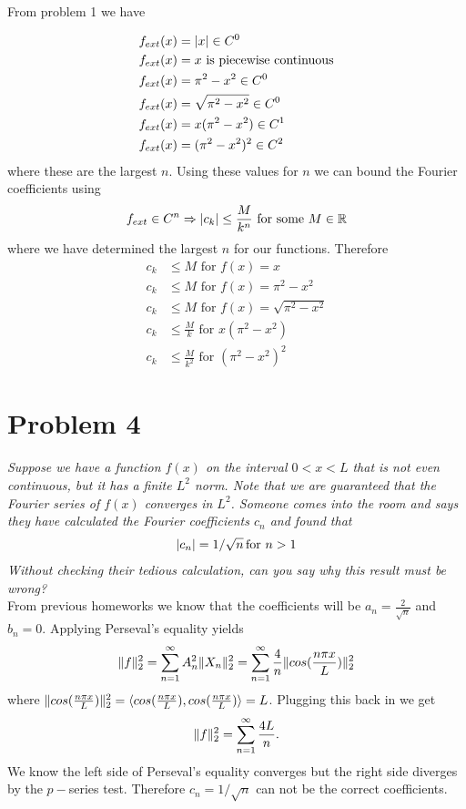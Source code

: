 \documentclass[12pt]{article}
\DeclarePairedDelimiter \abs{\lvert}{\rvert}%
\DeclarePairedDelimiter \norm{\lVert}{\rVert}%
\theoremstyle{remark}
\begin{document}
From problem 1 we have 

\begin{align*}
	f_{ext}(x) & = \abs{x} \in C^0 \\
	f_{ext}(x) & = x \text{ is piecewise continuous} \\
	f_{ext}(x) & = \pi^2 - x^2 \in C^0 \\
	f_{ext}(x) & = \sqrt{\pi^2 - x^2} \in C^0 \\
	f_{ext}(x) & = x(\pi^2 - x^2) \in C^1 \\
	f_{ext}(x) & = (\pi^2 - x^2)^2 \in C^2
\end{align*}
where these are the largest $n$. Using these values for $n$ we can bound the Fourier coefficients using 
\begin{align*}
	f_{ext} \in C^n \Rightarrow \abs{c_k} \leq \frac{M}{k^n} \text{ for some } M \in \mathbb{R}
\end{align*}
where we have determined the largest $n$ for our functions. Therefore 
\begin{align*}
	c_k & \leq M \text{ for } f(x) = x \\
	c_k & \leq M \text{ for } f(x) = \pi^2 - x^2 \\
	c_k & \leq M \text{ for } f(x) = \sqrt{\pi^2 - x^2} \\
	c_k & \leq \frac{M}{k} \text{ for } x(\pi^2 - x^2) \\
	c_k & \leq \frac{M}{k^2} \text{ for } (\pi^2 - x^2)^2
\end{align*}

\newpage

\section*{Problem 4}

\textit{Suppose we have a function $f(x)$ on the interval $0 < x < L$ that is not even continuous, but it has a finite $L^2$ norm. Note that we are guaranteed that the Fourier series of $f(x)$ converges in $L^2$. Someone comes into the room and says they have calculated the Fourier coefficients $c_n$ and found that}
\begin{align}
	\abs{c_n} = 1/\sqrt{n} \, \text{for $n > 1$}
\end{align}
\textit{Without checking their tedious calculation, can you say why this result must be wrong?} \\

From previous homeworks we know that the coefficients will be $a_n = \frac{2}{\sqrt{n}}$ and $b_n = 0$. Applying Perseval's equality yields
\begin{align*}
	\norm{f}_2^2 = \sum\limits_{n=1}^\infty A_n^2 \norm{X_n}_2^2 = \sum\limits_{n=1}^\infty \frac{4}{n}\norm{cos(\frac{n\pi x}{L})}_2^2
\end{align*}
where $\norm{cos(\frac{n\pi x}{L})}_2^2 = \braket{cos(\frac{n\pi x}{L}), cos(\frac{n\pi x}{L})} = L$. Plugging this back in we get 
\begin{align*}
	\norm{f}_2^2 = \sum\limits_{n=1}^\infty \frac{4L}{n}.
\end{align*}
We know the left side of Perseval's equality converges but the right side diverges by the $p-$series test. Therefore $c_n = 1/\sqrt{n}$ can not be the correct coefficients.
\end{document}
